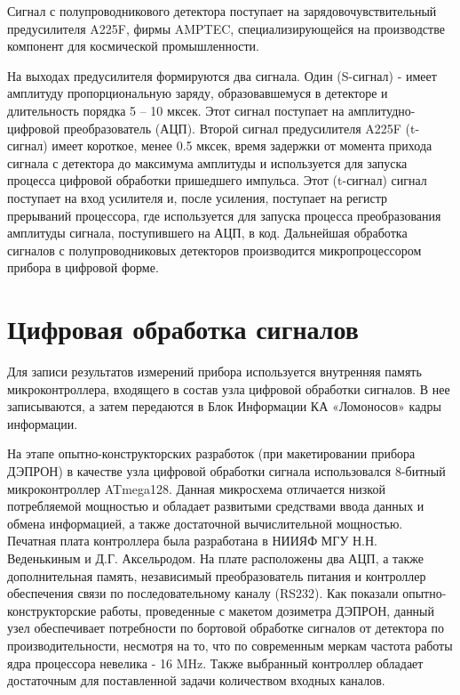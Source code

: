 Сигнал с полупроводникового детектора поступает на зарядовочувствительный предусилителя A225F, фирмы AMPTEC, специализирующейся на производстве компонент для космической промышленности. 


На выходах предусилителя формируются два сигнала. Один (S-сигнал) - имеет амплитуду пропорциональную заряду, образовавшемуся в детекторе и длительность порядка 5 -- 10 мксек. Этот сигнал поступает на амплитудно-цифровой преобразователь (АЦП). Второй сигнал предусилителя A225F (t-сигнал) имеет короткое, менее 0.5 мксек, время задержки от момента прихода сигнала с детектора до максимума амплитуды и используется для запуска процесса цифровой обработки пришедшего импульса. Этот (t-сигнал) сигнал поступает на вход усилителя и, после усиления, поступает на регистр прерываний процессора, где используется для запуска процесса преобразования амплитуды сигнала, поступившего на АЦП, в код. Дальнейшая обработка сигналов с полупроводниковых детекторов производится микропроцессором прибора в цифровой форме.

\section{Цифровая обработка сигналов}

Для записи результатов измерений прибора используется внутренняя память микроконтроллера, входящего в состав узла цифровой обработки сигналов. В нее записываются, а затем передаются в Блок Информации КА «Ломоносов» кадры информации.

На этапе опытно-конструкторских разработок (при макетировании прибора ДЭПРОН) в качестве узла цифровой обработки сигнала использовался 8-битный микроконтроллер ATmega128. Данная микросхема отличается низкой потребляемой мощностью и обладает развитыми средствами ввода данных и обмена информацией, а также достаточной вычислительной мощностью. Печатная плата контроллера была разработана в  НИИЯФ МГУ Н.Н. Веденькиным и Д.Г. Аксельродом. На плате расположены два АЦП, а также дополнительная память, независимый преобразователь питания и контроллер обеспечения связи по последовательному каналу (RS232). Как показали опытно-конструкторские работы, проведенные с макетом дозиметра ДЭПРОН, данный узел обеспечивает потребности по бортовой обработке сигналов от детектора по производительности, несмотря на то, что по современным меркам частота работы ядра процессора невелика - 16 MHz. Также выбранный контроллер обладает достаточным для поставленной задачи количеством входных каналов.

